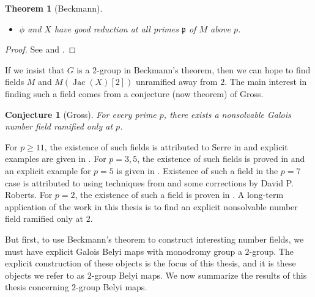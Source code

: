 \documentclass{dcthesis}
\newcommand{\defi}[1]{\textsf{#1}}
\DeclareMathOperator{\Jac}{Jac}
\numberwithin{equation}{section}
\newtheorem{theorem}[equation]{Theorem}
\newtheorem{conj}[equation]{Conjecture}
\theoremstyle{definition}
\theoremstyle{remark}
\begin{document}
{{{\begin{theorem}[Beckmann]
\begin{itemize}
        \item
          $\phi$ and $X$ have good reduction at all primes $\mathfrak{p}$
          of $M$ above $p$.
      \end{itemize}
    \end{theorem}
    \begin{proof}
      See \cite{beckmann} and \cite[Proposition 2.9]{beckmannref}.
    \end{proof}
    If we insist that $G$ is a $2$-group
    in Beckmann's theorem,
    then we can hope to find
    fields $M$
    and $M(\Jac(X)[2])$ unramified away from $2$.
    The main interest in finding such a field
    comes from a conjecture
    (now theorem) of Gross.
    \begin{conj}[Gross]
      \label{conj:gross}
      For every prime $p$,
      there exists a nonsolvable Galois
      number field
      ramified only at $p$.
    \end{conj}
    For $p\geq 11$, the existence of such
    fields is attributed to Serre in
    \cite{serre32,serre33}
    and explicit examples are given
    in \cite{mascot}.
    For $p=3,5$, the existence of such fields
    is proved in \cite{DGV}
    and an explicit example for $p=5$
    is given in \cite{roberts5}.
    Existence of such a field in the $p=7$ case
    is attributed to
    \cite{die} using techniques from
    \cite{DGV} and some corrections by
    David P. Roberts.
    For $p=2$, the existence of such a field
    is proven in \cite{lassina}.
    A long-term application of the work
    in this thesis is to
    find an explicit nonsolvable number field
    ramified only at $2$.
    \par
    But first, to use Beckmann's theorem
    to construct interesting number fields,
    we must have explicit
    Galois Belyi maps with monodromy group
    a $2$-group.
    The explicit construction of these
    objects is the focus of this thesis,
    and it is these objects we refer to as
    \defi{$2$-group Belyi maps}.
    We now summarize the results of this thesis
    concerning
    $2$-group Belyi maps.
  }
}}
\end{document}
